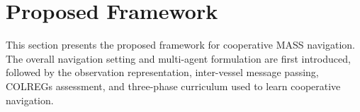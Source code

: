 \documentclass[final,5p,times,twocolumn]{elsarticle}
\begin{document}
\section{Proposed Framework}
{\color{violet}
This section presents the proposed framework for cooperative MASS navigation. The overall navigation setting and multi-agent formulation are first introduced, followed by the observation representation, inter-vessel message passing, COLREGs assessment, and three-phase curriculum used to learn cooperative navigation.
}
\end{document}
